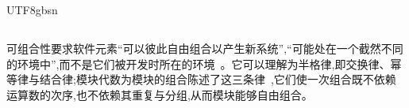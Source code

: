 \begin{CJK*}{UTF8}{gbsn}
\subsection{}
\label{sec:prior-composability}
\ifPaperChinese
可组合性要求软件元素``可以彼此自由组合以产生新系统'',``可能处在一个截然不同的环境中'',而不是它们被开发时所在的环境~\cite[第~42~页]{meyer1997-object-oriented-software-construction}。它可以理解为半格律,即交换律、幂等律与结合律;模块代数为模块的组合陈述了这三条律~\cite{bergstra1990-module-algebra},它们使一次组合既不依赖运算数的次序,也不依赖其重复与分组,从而模块能够自由组合。

\end{CJK*}
